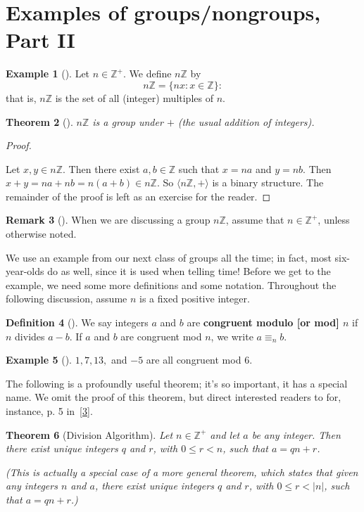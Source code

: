 \documentclass[10pt,]{book}
\newcommand{\terminology}[1]{\textbf{#1}}
\theoremstyle{plain}
\newtheorem{theorem}{Theorem}[section]
\theoremstyle{definition}
\newtheorem{definition}[theorem]{Definition}
\theoremstyle{definition}
\newtheorem{remark}[theorem]{Remark}
\theoremstyle{definition}
\newtheorem{example}[theorem]{Example}
\theoremstyle{definition}
\numberwithin{equation}{section}
\def\Z{\mathbb{Z}}
\newcommand{\lt}{<}
\begin{document}
\section[{Examples of groups/nongroups, Part II}]{Examples of groups/nongroups, Part II}\label{gpexs2}
\begin{example}[]\label{example-16}
\label{notation-38}
 Let \(n\in \Z^+\). We define \(n\Z\) by%
\begin{equation*}
n\Z=\{nx: x\in \Z\}:
\end{equation*}
that is, \(n\Z\) is the set of all (integer) multiples of \(n\).%
\end{example}
\begin{theorem}[{}]\label{nz}
\(n\Z\) is a group under \(+\) (the usual addition of integers).%
\end{theorem}
\begin{proof}\hypertarget{proof-13}{}
Let \(x, y\in n\Z\). Then there exist \(a,b\in \Z\) such that \(x=na\) and \(y=nb\). Then \(x+y=na+nb=n(a+b)\in n\Z\). So \(\langle n\Z,+\rangle\) is a binary structure. The remainder of the proof is left as an exercise for the reader.%
\end{proof}
\begin{remark}[]\label{remark-12}
When we are discussing a group \(n\Z\), assume that \(n\in \Z^+\), unless otherwise noted.%
\end{remark}
We use an example from our next class of groups all the time; in fact, most six-year-olds do as well, since it is used when telling time! Before we get to the example, we need some more definitions and some notation. Throughout the following discussion, assume \(n\) is a fixed positive integer.%
\begin{definition}[{}]\label{definition-24}
\label{notation-39}
We say integers \(a\) and \(b\) are \terminology{congruent modulo [or mod] \(n\)} if \(n\) divides \(a-b\). If \(a\) and \(b\) are congruent mod \(n\), we write \(a \equiv_n b\).%
\end{definition}
\begin{example}[]\label{cong_ex}
\(1, 7, 13,\) and \(-5\) are all congruent mod \(6\).%
\end{example}
The following is a profoundly useful theorem; it's so important, it has a special name. We omit the proof of this theorem, but direct interested readers to for, instance, p. 5 in~\hyperlink{NZM}{[3]}.%
\begin{theorem}[{Division Algorithm}]\label{divalg}
Let \(n\in \Z^+\) and let \(a\) be any integer. Then there exist unique integers \(q\) and \(r\), with \(0\leq
r \lt n\), such that \(a=qn+r\).%
\par
(This is actually a special case of a more general theorem, which states that given any integers \(n\) and \(a\), there exist unique integers \(q\) and \(r\), with \(0\leq
r\lt |n|\), such that \(a=qn+r\).)%
\end{theorem}
\end{document}
